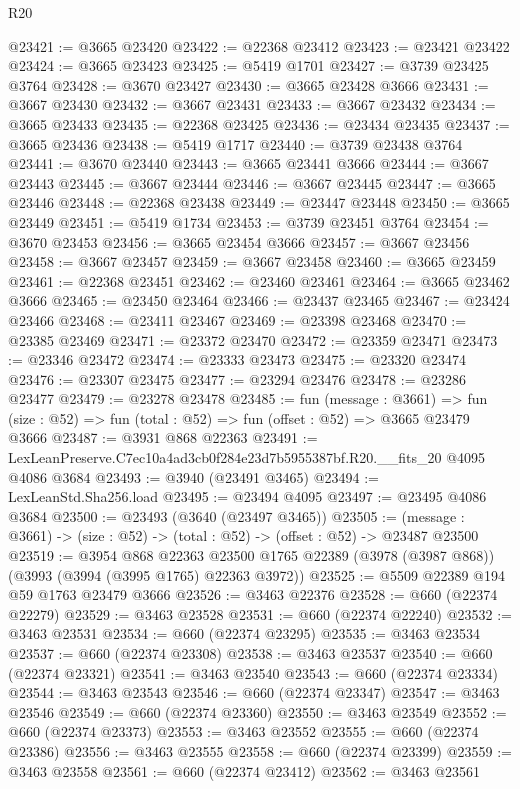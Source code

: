 \begin{lexlean}{R20}
\begin{coremodule}
@23421 := @3665 @23420
@23422 := @22368 @23412
@23423 := @23421 @23422
@23424 := @3665 @23423
@23425 := @5419 @1701
@23427 := @3739 @23425 @3764
@23428 := @3670 @23427
@23430 := @3665 @23428 @3666
@23431 := @3667 @23430
@23432 := @3667 @23431
@23433 := @3667 @23432
@23434 := @3665 @23433
@23435 := @22368 @23425
@23436 := @23434 @23435
@23437 := @3665 @23436
@23438 := @5419 @1717
@23440 := @3739 @23438 @3764
@23441 := @3670 @23440
@23443 := @3665 @23441 @3666
@23444 := @3667 @23443
@23445 := @3667 @23444
@23446 := @3667 @23445
@23447 := @3665 @23446
@23448 := @22368 @23438
@23449 := @23447 @23448
@23450 := @3665 @23449
@23451 := @5419 @1734
@23453 := @3739 @23451 @3764
@23454 := @3670 @23453
@23456 := @3665 @23454 @3666
@23457 := @3667 @23456
@23458 := @3667 @23457
@23459 := @3667 @23458
@23460 := @3665 @23459
@23461 := @22368 @23451
@23462 := @23460 @23461
@23464 := @3665 @23462 @3666
@23465 := @23450 @23464
@23466 := @23437 @23465
@23467 := @23424 @23466
@23468 := @23411 @23467
@23469 := @23398 @23468
@23470 := @23385 @23469
@23471 := @23372 @23470
@23472 := @23359 @23471
@23473 := @23346 @23472
@23474 := @23333 @23473
@23475 := @23320 @23474
@23476 := @23307 @23475
@23477 := @23294 @23476
@23478 := @23286 @23477
@23479 := @23278 @23478
@23485 := fun (message : @3661) =>
  fun (size : @52) => fun (total : @52) => fun (offset : @52) => @3665 @23479 @3666
@23487 := @3931 @868 @22363
@23491 := LexLeanPreserve.C7ec10a4ad3cb0f284e23d7b5955387bf.R20.__fits_20 @4095 @4086 @3684
@23493 := @3940 (@23491 @3465)
@23494 := LexLeanStd.Sha256.load
@23495 := @23494 @4095
@23497 := @23495 @4086 @3684
@23500 := @23493 (@3640 (@23497 @3465))
@23505 := (message : @3661) -> (size : @52) -> (total : @52) -> (offset : @52) -> @23487 @23500
@23519 := @3954
    @868
    @22363
    @23500
    @1765
    @22389
    (@3978 (@3987 @868))
    (@3993 (@3994 (@3995 @1765) @22363 @3972))
@23525 := @5509 @22389 @194 @59 @1763 @23479 @3666
@23526 := @3463 @22376
@23528 := @660 (@22374 @22279)
@23529 := @3463 @23528
@23531 := @660 (@22374 @22240)
@23532 := @3463 @23531
@23534 := @660 (@22374 @23295)
@23535 := @3463 @23534
@23537 := @660 (@22374 @23308)
@23538 := @3463 @23537
@23540 := @660 (@22374 @23321)
@23541 := @3463 @23540
@23543 := @660 (@22374 @23334)
@23544 := @3463 @23543
@23546 := @660 (@22374 @23347)
@23547 := @3463 @23546
@23549 := @660 (@22374 @23360)
@23550 := @3463 @23549
@23552 := @660 (@22374 @23373)
@23553 := @3463 @23552
@23555 := @660 (@22374 @23386)
@23556 := @3463 @23555
@23558 := @660 (@22374 @23399)
@23559 := @3463 @23558
@23561 := @660 (@22374 @23412)
@23562 := @3463 @23561

\end{coremodule}
\end{lexlean}
